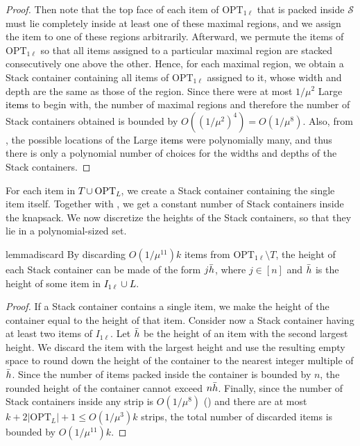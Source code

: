 \documentclass[10pt,a4paper]{amsart}
\newcommand{\kvnnew}[1]{\textcolor{black}{#1}}
\newcommand{\akr}[1]{}
\newcommand{\SM}{\mathcal{S}}
\theoremstyle{definition}
\newcommand{\OPTonel}{\text{OPT}_{1\ell}}
\newcommand{\OPTL}{\text{OPT}_L}
\begin{document}
\begin{proof}
    
    Then note that the top face of each item of $\OPTonel$ that is packed inside $\SM$ must lie completely inside at least one of these maximal regions, and we assign the item to one of these regions arbitrarily. Afterward, we permute the items of $\OPTonel$ so that all items assigned to a particular maximal region are stacked consecutively one above the other. Hence, for each maximal region, we obtain a Stack container containing all items of $\OPTonel$ assigned to it, whose width and depth are the same as those of the region. Since there were at most $1/\mu^2$ Large \kvnnew{items} to begin with, the number of maximal regions and therefore the number of Stack containers obtained is bounded by $O((1/\mu^2)^4) = O(1/\mu^8)$. Also, from , the possible locations of the Large \kvnnew{items} were polynomially many, and thus there is only a polynomial number of choices for the widths and depths of the Stack containers.
\end{proof}


For each item in \kvnnew{$T\cup \OPTL$}, we create a Stack container containing the single item itself. Together with , we get a constant number of Stack containers inside the knapsack. We now discretize the heights of the Stack containers, so that they lie in a polynomial-sized set.

\begin{restatable}{lemma}{discard}
\label{lem:discard}
    By discarding $O(1/\mu^{11})k$ items from $\OPTonel\setminus T$, the height of each Stack container can be made of the form $j\Bar{h}$, where $j\in [n]$ and $\Bar{h}$ is the height of some item in \kvnnew{$I_{1\ell}\cup L$}.
\end{restatable}
\begin{proof}
If a Stack container contains a single item, we make the height of the container equal to the height of that item. Consider now a Stack container having at least two items of $I_{1\ell}$. Let $\Bar{h}$ be the height of an item with the second largest height. We discard the item with the largest height and use the resulting empty space to round down the height of the container to the nearest integer multiple of $\Bar{h}$. Since the number of items packed inside the container is bounded by $n$, the rounded height of the container cannot exceed $n\Bar{h}$. Finally, since the number of Stack containers inside any strip is $O(1/\mu^8)$ () and there are at most $k+2|\OPTL|+1 \le O(1/\mu^3)k$ strips, the total number of discarded items is bounded by $O(1/\mu^{11})k$.
\end{proof}
\end{document}
